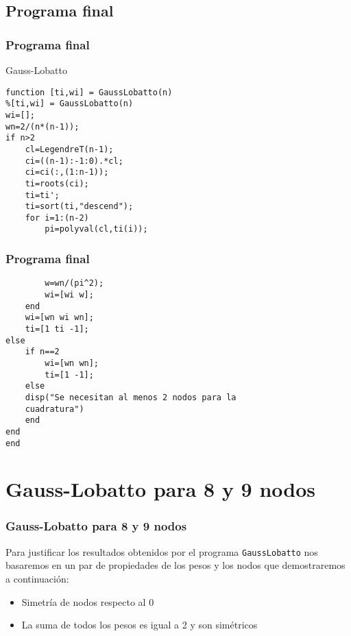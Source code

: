 \documentclass{beamer}
\begin{document}
\subsection{Programa final}
\begin{frame}[fragile]
\frametitle{Programa final}
\begin{exampleblock}{Gauss-Lobatto}
\begin{verbatim}
function [ti,wi] = GaussLobatto(n)
%[ti,wi] = GaussLobatto(n)
wi=[];
wn=2/(n*(n-1));
if n>2
    cl=LegendreT(n-1);
    ci=((n-1):-1:0).*cl;
    ci=ci(:,(1:n-1));
    ti=roots(ci);
    ti=ti';
    ti=sort(ti,"descend");
    for i=1:(n-2)
        pi=polyval(cl,ti(i));
\end{verbatim}
\end{exampleblock}
\end{frame}

\begin{frame}[fragile]
\frametitle{Programa final}
\begin{exampleblock}{}
\begin{verbatim}
        w=wn/(pi^2);
        wi=[wi w];
    end
    wi=[wn wi wn];
    ti=[1 ti -1];
else 
    if n==2
        wi=[wn wn];
        ti=[1 -1];
    else
    disp("Se necesitan al menos 2 nodos para la 
    cuadratura")
    end
end
end
\end{verbatim}
\end{exampleblock}
\end{frame}
\section{Gauss-Lobatto para 8 y 9 nodos}

\begin{frame}
\frametitle{Gauss-Lobatto para 8 y 9 nodos}
Para justificar los resultados obtenidos por el programa \texttt{GaussLobatto} nos basaremos en un par de propiedades de los pesos y los nodos que demostraremos a continuación:
\begin{itemize}
    \item Simetría de nodos respecto al 0
    \item La suma de todos los pesos es igual a 2 y son simétricos
\end{itemize}
\end{frame}

\end{document}
